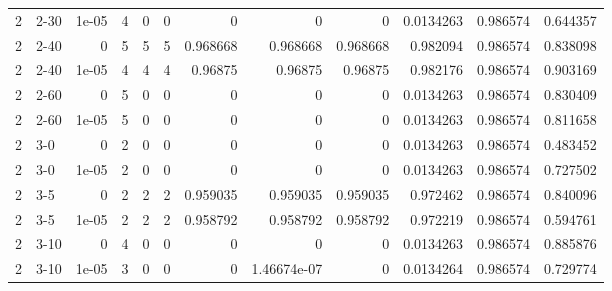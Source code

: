 \begin{tabular}{rlrrrrrrrrrr}
     2 & 2-30   &      1e-05 &           4 &                 0 &                 0 &     0           &     0           &      0           &        0.0134263 &               0.986574 &           0.644357 \\
     2 & 2-40   &      0     &           5 &                 5 &                 5 &     0.968668    &     0.968668    &      0.968668    &        0.982094  &               0.986574 &           0.838098 \\
     2 & 2-40   &      1e-05 &           4 &                 4 &                 4 &     0.96875     &     0.96875     &      0.96875     &        0.982176  &               0.986574 &           0.903169 \\
     2 & 2-60   &      0     &           5 &                 0 &                 0 &     0           &     0           &      0           &        0.0134263 &               0.986574 &           0.830409 \\
     2 & 2-60   &      1e-05 &           5 &                 0 &                 0 &     0           &     0           &      0           &        0.0134263 &               0.986574 &           0.811658 \\
     2 & 3-0    &      0     &           2 &                 0 &                 0 &     0           &     0           &      0           &        0.0134263 &               0.986574 &           0.483452 \\
     2 & 3-0    &      1e-05 &           2 &                 0 &                 0 &     0           &     0           &      0           &        0.0134263 &               0.986574 &           0.727502 \\
     2 & 3-5    &      0     &           2 &                 2 &                 2 &     0.959035    &     0.959035    &      0.959035    &        0.972462  &               0.986574 &           0.840096 \\
     2 & 3-5    &      1e-05 &           2 &                 2 &                 2 &     0.958792    &     0.958792    &      0.958792    &        0.972219  &               0.986574 &           0.594761 \\
     2 & 3-10   &      0     &           4 &                 0 &                 0 &     0           &     0           &      0           &        0.0134263 &               0.986574 &           0.885876 \\
     2 & 3-10   &      1e-05 &           3 &                 0 &                 0 &     0           &     1.46674e-07 &      0           &        0.0134264 &               0.986574 &           0.729774 \\

\end{tabular}
